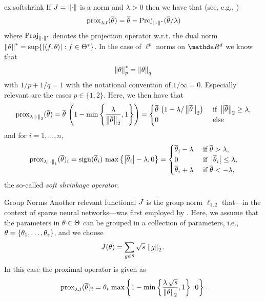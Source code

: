\begin{example}{}{ex:softshrink}
If $J=\left\|\cdot\right\|$ is a norm and $\lambda>0$ then we have that (see, e.g., \cite{parikh2014proximal})
%
\begin{align*}
\,\mathrm{prox}_{\lambda J}(\overline\theta) = 
\overline\theta - \operatorname{Proj}_{\left\|\cdot\right\|^\ast}(\overline\theta/\lambda)
\end{align*}
%
where $\operatorname{Proj}_{\left\|\cdot\right\|^\ast}$ denotes the projection operator w.r.t. the dual norm $\left\|\theta\right\|^\ast = \sup\{\left|\langle f , \theta\rangle\right|: f\in\Theta^\ast\}$. In the case of $\ell^p$ norms on $\R^d$ we know that
%
\begin{align*}
\left\|\theta\right\|_p^\ast = \left\|\theta\right\|_q
\end{align*}
%
with $1/p + 1/q = 1$ with the notational convention of $1/\infty=0$. Especially relevant are the cases $p\in\{1,2\}$. Here, we then have that
%
\begin{align*}
\prox{\lambda\norm{\cdot}_2}(\pparam) = 
%
\pparam\,\left(1 - \min\left\{\frac{\lambda}{\norm{\pparam}_2}, 1\right\}\right)=
%
\begin{cases}
\pparam\,\left(1 - \lambda/\norm{\pparam}_2\right) &\text{ if } \norm{\pparam}_2 \geq \lambda,\\
0 &\text{ else}
\end{cases}
\end{align*}
%
and for $i=1,\ldots,n$,
%
\begin{align*}
\prox{\lambda\norm{\cdot}_1}(\pparam)_i
%
= \sign(\pparam_i)\, \max\left\{\abs{\pparam_i} - \lambda, 0\right\} =
%
\begin{cases}
\pparam_i -\lambda &\text{ if }\pparam > \lambda,\\
0 &\text{ if } \abs{\pparam_i}\leq \lambda,\\
\pparam_i +\lambda &\text{ if }\pparam < -\lambda,
\end{cases}
\end{align*}
%
the so-called \emph{soft shrinkage operator}. 
\end{example}
%
%
\begin{example}{Group Norms}{}
Another relevant functional $J$ is the group norm $\ell_{1,2}$ that---in the context of sparse neural networks---was first employed by \cite{scardapane2017group}. Here, we assume that the parameters in $\theta\in\Theta$ can be grouped in a collection of parameters, i.e., $\theta=\{\theta_1,\ldots, \theta_s\}$, and we choose
%
\begin{align*}
J(\theta) = \sum_{g\in\theta} \sqrt{s}\, \left\|g\right\|_2.
\end{align*}
%
In this case the proximal operator is given as
%
\begin{align*}
\,\mathrm{prox}_{\lambda J}(\overline\theta)_i = \theta_i \, 
\max\left\{1- \min\left\{
\frac{\lambda\,\sqrt{s}}{\left\|\theta\right\|_2}
,1 \right\}
,0\right\}.
\end{align*}
\end{example}
